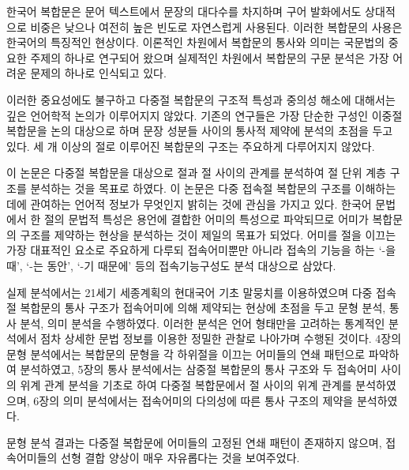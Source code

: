 \begin{summary}
%
%

\par

한국어 복합문은 문어 텍스트에서 문장의 대다수를 차지하며 구어 발화에서도
상대적으로 비중은 낮으나 여전히 높은 빈도로 자연스럽게 사용된다. 이러한 복합문의
사용은 한국어의 특징적인 현상이다. 이론적인 차원에서 복합문의 통사와 의미는
국문법의 중요한 주제의 하나로 연구되어 왔으며 실제적인 차원에서 복합문의 구문
분석은 가장 어려운 문제의 하나로 인식되고 있다.

%
%

이러한 중요성에도 불구하고 다중절 복합문의 구조적 특성과 중의성 해소에
대해서는 깊은 언어학적 논의가 이루어지지 않았다. 기존의 연구들은 가장 단순한
구성인 이중절 복합문을 논의 대상으로 하며 문장 성분들 사이의 통사적 제약에
분석의 초점을 두고 있다. 세 개 이상의 절로 이루어진 복합문의 구조는 주요하게
다루어지지 않았다.


%
%

이 논문은 다중절 복합문을 대상으로 절과 절 사이의 관계를 분석하여 절 단위 계층
구조를 분석하는 것을 목표로 하였다. 이 논문은 다중 접속절 복합문의 구조를
이해하는 데에 관여하는 언어적 정보가 무엇인지 밝히는 것에 관심을 가지고 있다.
한국어 문법에서 한 절의 문법적 특성은 용언에 결합한 어미의 특성으로 파악되므로
어미가 복합문의 구조를 제약하는 현상을 분석하는 것이 제일의 목표가 되었다.
어미를 절을 이끄는 가장 대표적인 요소로 주요하게 다루되 접속어미뿐만 아니라
접속의 기능을 하는 `-을 때', `-는 동안', `-기 때문에' 등의 접속기능구성도 분석
대상으로 삼았다.

%
%

실제 분석에서는 21세기 세종계획의 현대국어 기초 말뭉치를 이용하였으며 다중
접속절 복합문의 통사 구조가 접속어미에 의해 제약되는 현상에 초점을 두고
문형 분석, 통사 분석, 의미 분석을 수행하였다. 이러한 분석은 언어 형태만을
고려하는 통계적인 분석에서 점차 상세한 문법 정보를 이용한 정밀한 관찰로
나아가며 수행된 것이다. 4장의 문형 분석에서는 복합문의 문형을 각 하위절을
이끄는 어미들의 연쇄 패턴으로 파악하여 분석하였고, 5장의 통사 분석에서는 삼중절
복합문의 통사 구조와 두 접속어미 사이의 위계 관계 분석을 기초로 하여 다중절
복합문에서 절 사이의 위계 관계를 분석하였으며, 6장의 의미 분석에서는 접속어미의
다의성에 따른 통사 구조의 제약을 분석하였다.

%
%

문형 분석 결과는 다중절 복합문에 어미들의 고정된 연쇄 패턴이 존재하지
않으며, 접속어미들의 선형 결합 양상이 매우 자유롭다는 것을 보여주었다.



\end{summary}
